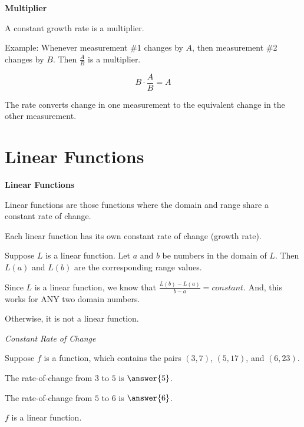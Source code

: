 \documentclass{ximera}
\begin{document}
\begin{idea} \textbf{\textcolor{blue!55!black}{Multiplier}}


A constant growth rate is a multiplier.


Example: Whenever measurement \#1 changes by $A$, then measurement \#2 changes by $B$.  Then $\frac{A}{B}$ is a multiplier.  

\[
B \cdot \frac{A}{B} = A
\]


The rate converts change in one measurement to the equivalent change in the other measurement.

\end{idea}





















\section*{Linear Functions}






\begin{definition} \textbf{\textcolor{green!50!black}{Linear Functions}} 

Linear functions are those functions where the domain and range share a constant rate of change.  

\end{definition}


Each linear function has its own constant rate of change (growth rate). 


Suppose $L$ is a linear function.  Let $a$ and $b$ be numbers in the domain of $L$.  Then $L(a)$ and $L(b)$ are the corresponding range values.

Since $L$ is a linear function, we know that $\frac{L(b) - L(a)}{b - a} = constant$.  And, this works for ANY two domain numbers.

Otherwise, it is not a linear function.







\begin{example} \textit{Constant Rate of Change}


Suppose $f$ is a function, which contains the pairs $(3, 7)$, $(5, 17)$, and $(6, 23)$.


The rate-of-change from $3$ to $5$ is $\answer{5}$.

The rate-of-change from $5$ to $6$ is $\answer{6}$.

\begin{question} 
$f$ is a linear function.
\begin{multipleChoice}
\end{multipleChoice}
\end{question}

\end{example}
\end{document}
